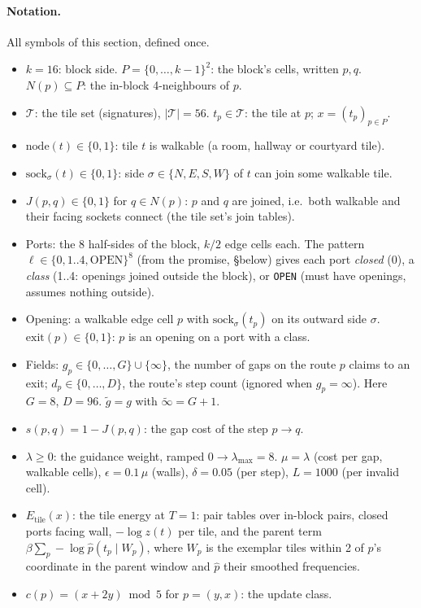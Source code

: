 \documentclass[11pt]{article}
\newcommand{\1}{\mathds{1}}
\begin{document}
\paragraph{Notation.} All symbols of this section, defined once.
\begin{itemize}
  \item $k = 16$: block side. $P = \{0,\dots,k-1\}^2$: the block's cells, written $p, q$.
        $N(p) \subseteq P$: the in-block 4-neighbours of $p$.
  \item $\mathcal T$: the tile set (signatures), $|\mathcal T| = 56$.
        $t_p \in \mathcal T$: the tile at $p$; $x = (t_p)_{p \in P}$.
  \item $\mathrm{node}(t) \in \{0,1\}$: tile $t$ is walkable (a room, hallway or courtyard tile).
  \item $\mathrm{sock}_\sigma(t) \in \{0,1\}$: side $\sigma \in \{N,E,S,W\}$ of $t$ can join some walkable tile.
  \item $J(p,q) \in \{0,1\}$ for $q \in N(p)$: $p$ and $q$ are joined, i.e.\ both walkable and
        their facing sockets connect (the tile set's join tables).
  \item Ports: the 8 half-sides of the block, $k/2$ edge cells each. The pattern
        $\ell \in \{0, 1..4, \mathrm{OPEN}\}^8$ (from the promise, \S below) gives each port
        \emph{closed} (0), a \emph{class} (1..4: openings joined outside the block), or
        \texttt{OPEN} (must have openings, assumes nothing outside).
  \item Opening: a walkable edge cell $p$ with $\mathrm{sock}_\sigma(t_p)$ on its outward side $\sigma$.
        $\mathrm{exit}(p) \in \{0,1\}$: $p$ is an opening on a port with a class.
  \item Fields: $g_p \in \{0,\dots,G\} \cup \{\infty\}$, the number of gaps on the route $p$
        claims to an exit; $d_p \in \{0,\dots,D\}$, the route's step count (ignored when
        $g_p = \infty$). Here $G = 8$, $D = 96$. $\tilde g = g$ with $\tilde\infty = G + 1$.
  \item $s(p,q) = 1 - J(p,q)$: the gap cost of the step $p \to q$.
  \item $\lambda \ge 0$: the guidance weight, ramped $0 \to \lambda_{\max} = 8$.
        $\mu = \lambda$ (cost per gap, walkable cells), $\epsilon = 0.1\,\mu$ (walls),
        $\delta = 0.05$ (per step), $L = 1000$ (per invalid cell).
  \item $E_{\text{tile}}(x)$: the tile energy at $T = 1$: pair tables over in-block pairs,
        closed ports facing wall, $-\log z(t)$ per tile, and the parent term
        $\beta \sum_p -\log \hat p(t_p \mid W_p)$, where $W_p$ is the exemplar tiles within
        2 of $p$'s coordinate in the parent window and $\hat p$ their smoothed frequencies.
  \item $c(p) = (x+2y) \bmod 5$ for $p = (y,x)$: the update class.
\end{itemize}
\end{document}
